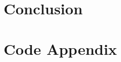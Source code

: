 \documentclass[13pt]{ucthesis}
\begin{document}
%

\chapter{Conclusion}\label{ch:Conclusion}





\setcounter{secnumdepth}{0}
\chapter*{Code Appendix}

\end{document}
